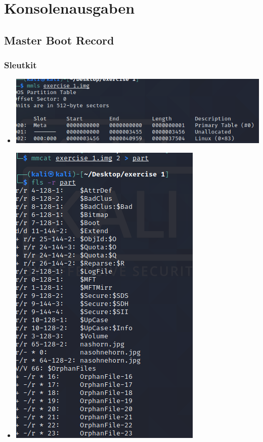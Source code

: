\chapter{Konsolenausgaben}

\section{Master Boot Record}

\subsection{Sleutkit}

\begin{itemize}
\item \includegraphics[scale=0.6]{bilder/partition_table.png } 
\item \includegraphics[scale=0.6]{bilder/analyse_Dateisystem.png } 

\end{itemize}
